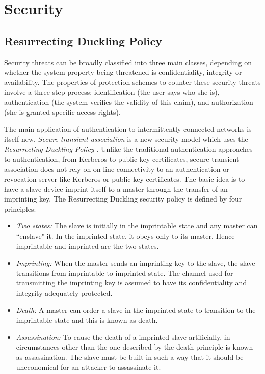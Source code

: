 \chapter{Security}
\section {Resurrecting Duckling Policy}
Security threats can be broadly classified into three main classes, depending on whether the system property being threatened is confidentiality, integrity or availability. The properties of protection schemes to counter these security threats involve a three-step process: identification (the user says who she is), authentication (the system verifies the validity of this claim), and authorization (she is granted specific access rights).

The main application of authentication to intermittently connected networks is itself new. \emph{Secure transient association} is a new security model which uses the \emph{Resurrecting Duckling Policy} \cite{Sta_duck}. Unlike the traditional authentication approaches to authentication, from Kerberos to public-key certificates, secure transient association does not rely on on-line connectivity to an authentication or revocation server like Kerberos or public-key certificates. The basic idea is to have a slave device imprint itself to a master through the transfer of an imprinting key. The Resurrecting Duckling security policy is defined by four principles: 

\begin {itemize}
\item \emph{Two states:} The slave is initially in the imprintable state and any master can ``enslave" it. In the imprinted state, it obeys only to its master. Hence imprintable and imprinted are the two states.

\item \emph{Imprinting:} When the master sends an imprinting key to the slave, the slave transitions from imprintable to imprinted state. The channel used for transmitting the imprinting key is assumed to have its confidentiality and integrity adequately protected.

\item \emph{Death:} A master can order a slave in the imprinted state to transition to the imprintable state and this is known as death.

\item \emph{Assassination:} To cause the death of a imprinted slave artificially, in circumstances other than the one described by the death principle is known as assassination. The slave must be built in such a way that it should be uneconomical for an attacker to assassinate it.
\end {itemize}

